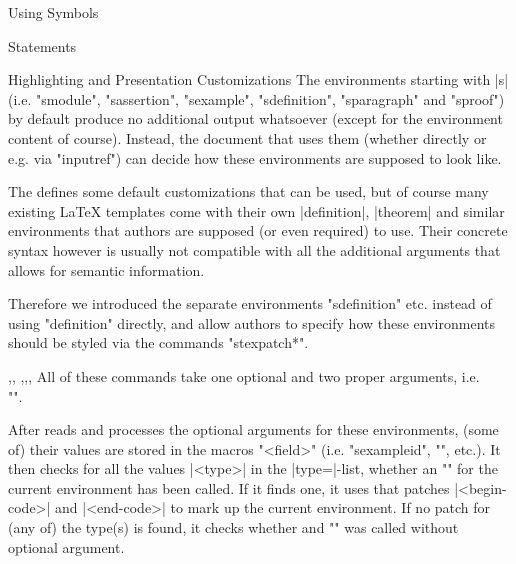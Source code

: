 \begin{sfragment}[id=sec.textsymbols]{Using \sTeX Symbols}
  

  

\end{sfragment}

\begin{sfragment}{\sTeX Statements}
  

  
\end{sfragment}

\begin{sfragment}[id=sec.customhighlight]{Highlighting and Presentation Customizations}
  The environments starting with |s| (i.e. \stexcode"smodule",
  \stexcode"sassertion", \stexcode"sexample", \stexcode"sdefinition",
  \stexcode"sparagraph" and \stexcode"sproof") by default produce
  no additional output whatsoever (except for the environment 
  content of course). Instead, the document that
  uses them (whether directly or e.g. via \stexcode"inputref")
  can decide how these environments are supposed to look like.

  The  defines some default customizations that can
  be used, but of course many existing \LaTeX\xspace templates
  come with their own |definition|, |theorem| and similar environments
  that authors are supposed (or even required) to use. Their
  concrete syntax however is usually not compatible with all the
  additional arguments that \sTeX allows for semantic information.

  Therefore we introduced the separate environments 
  \stexcode"sdefinition" etc.
  instead of using \stexcode"definition" directly, and allow
  authors to specify how these environments should be styled
  via the commands \stexcode"stexpatch*".

  \begin{function}{\stexpatchmodule,\stexpatchdefinition,
    \stexpatchassertion,\stexpatchexample,\stexpatchparagraph,
    \stexpatchproof}
    All of these commands take one optional and two proper arguments,
    i.e. 
    \\\stexcode"".

    After \stex reads and processes the optional arguments for
    these environments, (some of) their values are stored in the macros
    \stexcode"\s*<field>" (i.e. \stexcode"sexampleid",
    \stexcode"\sassertionname", etc.). It then checks
    for all the values |<type>| in the |type=|-list, whether an
    \stexcode"\stexpatch*[<type>]" for the current environment has
    been called. If it finds one, it uses that patches |<begin-code>|
    and |<end-code>| to mark up the current environment. If no patch
    for (any of) the type(s) is found, it checks whether and
    \stexcode"\stexpatch*" was called without optional argument.
  \end{function}


\end{sfragment}
